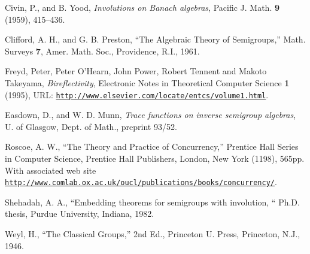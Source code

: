 \documentclass{endm}
\begin{document}
\begin{thebibliography}{10}\label{bibliography}

 Civin, P., and B. Yood, \emph{Involutions on Banach
    algebras}, Pacific J. Math. \textbf{9} (1959), 415--436.
  
 Clifford, A. H., and G. B. Preston, ``The Algebraic
  Theory of Semigroups,'' Math. Surveys \textbf{7}, Amer. Math. Soc.,
  Providence, R.I., 1961.
  
 Freyd, Peter, Peter O'Hearn, John Power, Robert Tennent
  and Makoto Takeyama, \emph{Bireflectivity}, Electronic Notes in
  Theoretical Computer Science {\bf 1} (1995), URL:
  \href{http://www.elsevier.com/locate/entcs/volume1.html}
  {\texttt{http://www.elsevier.com/locate/entcs/volume1.html}}.
  
 Easdown, D., and W. D. Munn, \emph{Trace functions on
    inverse semigroup algebras}, U. of Glasgow, Dept. of Math.,
  preprint 93/52.

 Roscoe, A. W., ``The Theory and Practice of Concurrency,''
  Prentice Hall Series in Computer Science, Prentice Hall Publishers,
  London, New York (1198), 565pp. With associated web site\\  
  \href{http://www.comlab.ox.ac.uk/oucl/publications/books/concurrency/}
  {\texttt{http://www.comlab.ox.ac.uk/oucl/publications/books/concurrency/}}.
  
 Shehadah, A. A., ``Embedding theorems for semigroups with
  involution, `` Ph.D.  thesis, Purdue University, Indiana, 1982.
  
 Weyl, H., ``The Classical Groups,'' 2nd Ed., Princeton U.
  Press, Princeton, N.J., 1946.

\end{thebibliography}
\end{document}
